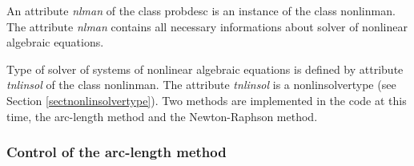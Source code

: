 An attribute {\it nlman} of
the class {\sf probdesc} is an instance of
the class {\sf nonlinman}. The attribute
{\it nlman} contains all necessary informations about solver of nonlinear algebraic equations.


Type of solver of systems of nonlinear algebraic equations is defined by
attribute {\it tnlinsol} of the class
{\sf nonlinman}.
The attribute {\it tnlinsol} is a {\sf nonlinsolvertype} (see Section \ref{sectnonlinsolvertype}). Two methods are
implemented in the code at this time, the arc-length method and
the Newton-Raphson method.

\subsubsection{Control of the arc-length method}
\label{sectcontracrmet}

